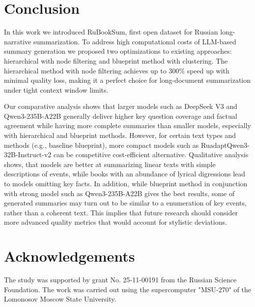 \documentclass{superfri}
\begin{document}

\section*{Conclusion}
In this work we introduced RuBookSum, first open dataset for Russian long-narrative summarization.
To address high computational costs of LLM-based summary generation we proposed two optimizations to existing approaches: 
hierarchical with node filtering and blueprint method with clustering.
The hierarchical method with node filtering achieves up to 300\% speed up with minimal quality loss,
making it a perfect choice for long-document summarization under tight context window limits.

Our comparative analysis shows that larger models such as DeepSeek V3 and Qwen3-235B-A22B generally deliver higher key question coverage and factual agreement
while having more complete summaries than smaller models, especially with hierarchical and blueprint methods.
However, for certain text types and methods (e.g., baseline blueprint), more compact models such as RuadaptQwen3-32B-Instruct-v2 can be competitive cost-efficient alternative.
Qualitative analysis shows, that models are better at summarizing linear texts with simple descriptions of events, while books with an abundance of lyrical digressions 
lead to models omitting key facts. In addition, while blueprint method in conjunction with strong model such as Qwen3-235B-A22B gives the best results, 
some of generated summaries may turn out to be similar to a enumeration of key events, rather than a coherent text. 
This implies that future research should consider more advanced quality metrics that would account for stylistic deviations.


\section*{Acknowledgements}
The study was supported by grant No. 25-11-00191 from the Russian Science Foundation.
The work was carried out using the supercomputer "MSU-270" of the Lomonosov Moscow State University.

\openaccess


\end{document}
